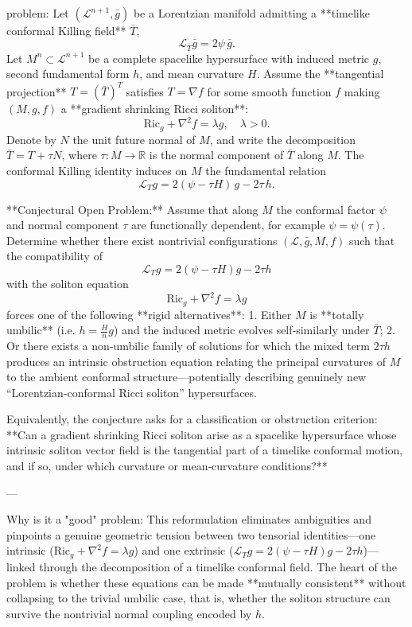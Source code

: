 problem:  
Let \((\mathcal{L}^{n+1}, \bar g)\) be a Lorentzian manifold admitting a **timelike conformal Killing field** \(\bar T\),  
\[
\mathcal L_{\bar T} \bar g = 2\psi\, \bar g.
\]
Let \(M^n \subset \mathcal{L}^{n+1}\) be a complete spacelike hypersurface with induced metric \(g\), second fundamental form \(h\), and mean curvature \(H\).  
Assume the **tangential projection** \(T = (\bar T)^T\) satisfies \(T = \nabla f\) for some smooth function \(f\) making \((M,g,f)\) a **gradient shrinking Ricci soliton**:
\[
\mathrm{Ric}_g + \nabla^2 f = \lambda g, \quad \lambda>0.
\]
Denote by \(N\) the unit future normal of \(M\), and write the decomposition \(\bar T = T + \tau N\), where \(\tau:\!M\to \mathbb R\) is the normal component of \(\bar T\) along \(M\).  
The conformal Killing identity induces on \(M\) the fundamental relation
\[
\mathcal L_T g = 2(\psi - \tau H)\, g - 2\tau\, h.
\]

**Conjectural Open Problem:**  
Assume that along \(M\) the conformal factor \(\psi\) and normal component \(\tau\) are functionally dependent, for example \(\psi=\psi(\tau)\).  Determine whether there exist nontrivial configurations \((\mathcal L,\bar g,M,f)\) such that the compatibility of  
\[
\mathcal L_T g = 2(\psi - \tau H) g - 2\tau h
\]
with the soliton equation
\[
\mathrm{Ric}_g + \nabla^2 f = \lambda g
\]
forces one of the following **rigid alternatives**:
1. Either \(M\) is **totally umbilic** (i.e. \(h = \frac{H}{n} g\)) and the induced metric evolves self‑similarly under \(\bar T\);  
2. Or there exists a non‑umbilic family of solutions for which the mixed term \(2\tau h\) produces an intrinsic obstruction equation relating the principal curvatures of \(M\) to the ambient conformal structure—potentially describing genuinely new “Lorentzian‑conformal Ricci soliton” hypersurfaces.

Equivalently, the conjecture asks for a classification or obstruction criterion: **Can a gradient shrinking Ricci soliton arise as a spacelike hypersurface whose intrinsic soliton vector field is the tangential part of a timelike conformal motion, and if so, under which curvature or mean‑curvature conditions?**

---

Why is it a "good" problem:  
This reformulation eliminates ambiguities and pinpoints a genuine geometric tension between two tensorial identities—one intrinsic (\(\mathrm{Ric}_g + \nabla^2 f = \lambda g\)) and one extrinsic (\(\mathcal L_T g = 2(\psi-\tau H) g - 2\tau h\))—linked through the decomposition of a timelike conformal field.  
The heart of the problem is whether these equations can be made **mutually consistent** without collapsing to the trivial umbilic case, that is, whether the soliton structure can survive the nontrivial normal coupling encoded by \(h\).  

